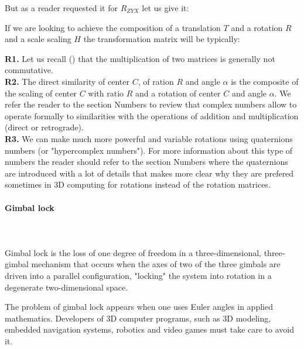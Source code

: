 	But as a reader requested it for $R_{ZYX}$ let us give it:
	
	
	If we are looking to achieve the composition of a translation $T$ and a rotation $R$ and a scale scaling $H$ the transformation matrix will be typically:
	
	\begin{tcolorbox}[title=Remarks,colframe=black,arc=10pt]
	\textbf{R1.} Let us recall () that the multiplication of two matrices is generally not commutative.\\
	
	\textbf{R2.} The direct similarity of center $C$, of ration $R$ and angle $\alpha$ is the composite of the scaling of center $C$ with ratio $R$ and a rotation of center $C$ and angle $\alpha$. We refer the reader to the section Numbers to review that complex numbers allow to operate formally to similarities with the operations of addition and multiplication (direct or retrograde).\\
	
	\textbf{R3.} We can make much more powerful and variable rotations using quaternions numbers (or "hypercomplex numbers"). For more information about this type of numbers the reader should refer to the section Numbers where the quaternions are introduced with a lot of details that makes more clear why they are prefered sometimes in 3D computing for rotations instead of the rotation matrices.
	\end{tcolorbox}
	
	\paragraph{Gimbal lock}\mbox{}\\\\
	Gimbal lock is the loss of one degree of freedom in a three-dimensional, three-gimbal mechanism that occurs when the axes of two of the three gimbals are driven into a parallel configuration, "locking" the system into rotation in a degenerate two-dimensional space.
	
	The problem of gimbal lock appears when one uses Euler angles in applied mathematics. Developers of 3D computer programs, such as 3D modeling, embedded navigation systems, robotics and video games must take care to avoid it.
	
